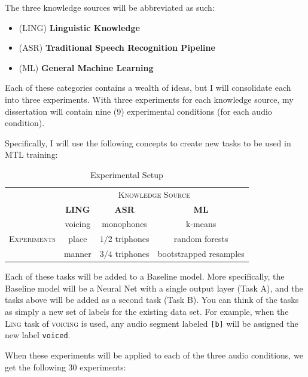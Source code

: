 \documentclass[10pt,a4paper]{article}
\begin{document}
The three knowledge sources will be abbreviated as such:
  
\begin{itemize}
\item  (\textsc{LING}) \textbf{Linguistic Knowledge} 
\item (\textsc{ASR}) \textbf{Traditional Speech Recognition Pipeline}
\item (\textsc{ML}) \textbf{General Machine Learning}
\end{itemize}


Each of these categories contains a wealth of ideas, but I will consolidate each into three experiments. With three experiments for each knowledge source, my dissertation will contain nine (9) experimental conditions (for each audio condition).

Specifically, I will use the following concepts to create new tasks to be used in MTL training:

\begin{table}[!htbp]
  \centering
  \begin{adjustbox}{width=.55\textwidth}
    \begin{tabular}{cccc}
      \toprule
      & \multicolumn{3}{c}{\textsc{Knowledge Source}}\\
      & \textbf{LING} & \textbf{ASR} & \textbf{ML}\\
      \midrule
      \multirow{3}{*}{\textsc{Experiments}} & voicing & monophones &  k-means \\
      & place & $1/2$ triphones & random forests  \\
      & manner & $3/4$ triphones &  bootstrapped resamples  \\
      \bottomrule
    \end{tabular}
    \label{table:data}
  \end{adjustbox}
  
  \caption{Experimental Setup}
  
\end{table}


Each of these tasks will be added to a Baseline model. More specifically, the Baseline model will be a Neural Net with a single output layer (Task A), and the tasks above will be added as a second task (Task B). You can think of the tasks as simply a new set of labels for the existing data set. For example, when the \textsc{Ling} task of \textsc{voicing} is used, any audio segment labeled \texttt{[b]} will be assigned the new label \texttt{voiced}.

When these experiments will be applied to each of the three audio conditions, we get the following 30 experiments:
\end{document}
